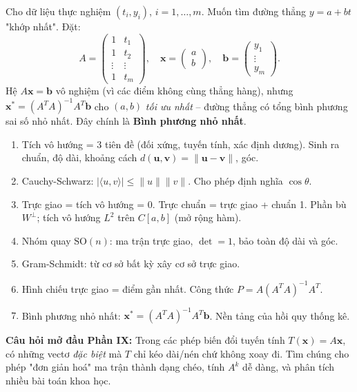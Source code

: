 \documentclass[12pt,a4paper]{article}
\begin{document}
\begin{ungdung}[title={Ứng dụng -- Hồi quy tuyến tính (linear regression)}]
Cho dữ liệu thực nghiệm $(t_i, y_i)$, $i = 1, \ldots, m$. Muốn tìm đường thẳng $y = a + bt$ "khớp nhất". Đặt:
\[
  A = \begin{pmatrix}1 & t_1\\ 1 & t_2\\ \vdots & \vdots\\ 1 & t_m\end{pmatrix},\quad \mathbf{x} = \begin{pmatrix}a\\ b\end{pmatrix},\quad \mathbf{b} = \begin{pmatrix}y_1\\ \vdots\\ y_m\end{pmatrix}.
\]
Hệ $A\mathbf{x} = \mathbf{b}$ vô nghiệm (vì các điểm không cùng thẳng hàng), nhưng $\mathbf{x}^* = (A^T A)^{-1} A^T \mathbf{b}$ cho $(a, b)$ \emph{tối ưu nhất} -- đường thẳng có tổng bình phương sai số nhỏ nhất. Đây chính là \textbf{Bình phương nhỏ nhất}.
\end{ungdung}

\begin{tongket}[title={Tổng kết Phần VIII}]
\begin{enumerate}
  \item Tích vô hướng = 3 tiên đề (đối xứng, tuyến tính, xác định dương). Sinh ra chuẩn, độ dài, khoảng cách $d(\mathbf{u},\mathbf{v}) = \|\mathbf{u}-\mathbf{v}\|$, góc.
  \item Cauchy-Schwarz: $|\langle u, v\rangle| \le \|u\|\|v\|$. Cho phép định nghĩa $\cos\theta$.
  \item Trực giao = tích vô hướng = 0. Trực chuẩn = trực giao + chuẩn 1. Phần bù $W^\perp$; tích vô hướng $L^2$ trên $C[a,b]$ (mở rộng hàm).
  \item Nhóm quay $\mathrm{SO}(n)$: ma trận trực giao, $\det = 1$, bảo toàn độ dài và góc.
  \item Gram-Schmidt: từ cơ sở bất kỳ xây cơ sở trực giao.
  \item Hình chiếu trực giao = điểm gần nhất. Công thức $P = A(A^T A)^{-1} A^T$.
  \item Bình phương nhỏ nhất: $\mathbf{x}^* = (A^T A)^{-1} A^T \mathbf{b}$. Nền tảng của hồi quy thống kê.
\end{enumerate}

\textbf{Câu hỏi mở đầu Phần IX:} Trong các phép biến đổi tuyến tính $T(\mathbf{x}) = A\mathbf{x}$, có những vectơ \emph{đặc biệt} mà $T$ chỉ kéo dài/nén chứ không xoay đi. Tìm chúng cho phép "đơn giản hoá" ma trận thành dạng chéo, tính $A^k$ dễ dàng, và phân tích nhiều bài toán khoa học.
\end{tongket}
\end{document}
